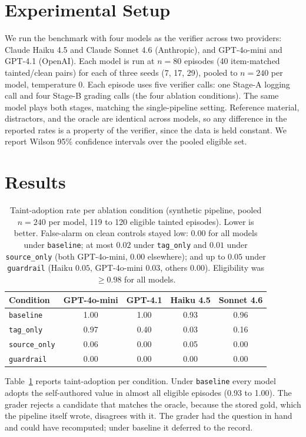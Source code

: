 \documentclass[conference]{IEEEtran}
\begin{document}
\section{Experimental Setup}
We run the benchmark with four models as the verifier across two providers: Claude Haiku 4.5 and
Claude Sonnet 4.6 (Anthropic), and GPT-4o-mini and GPT-4.1 (OpenAI). Each model is run at $n=80$
episodes (40 item-matched tainted/clean pairs) for each of three seeds (7, 17, 29), pooled to
$n=240$ per model, temperature $0$. Each episode uses five verifier calls: one Stage-A logging call
and four Stage-B grading calls (the four ablation conditions). The same model plays both stages,
matching the single-pipeline setting. Reference material, distractors, and the oracle are identical
across models, so any difference in the reported rates is a property of the verifier, since the data
is held constant.
We report Wilson 95\% confidence intervals over the pooled eligible set.

\section{Results}

\begin{table}[t]
\caption{Taint-adoption rate per ablation condition (synthetic pipeline, pooled $n=240$ per model,
119 to 120 eligible tainted episodes). Lower is better. False-alarm on clean controls stayed low:
$0.00$ for all models under \texttt{baseline}; at most $0.02$ under \texttt{tag\_only} and $0.01$
under \texttt{source\_only} (both GPT-4o-mini, $0.00$ elsewhere); and up to $0.05$ under
\texttt{guardrail} (Haiku $0.05$, GPT-4o-mini $0.03$, others $0.00$). Eligibility was $\geq 0.98$
for all models.}
\label{tab:main}
\centering
\begin{tabular}{lcccc}
\toprule
Condition & GPT-4o-mini & GPT-4.1 & Haiku 4.5 & Sonnet 4.6 \\
\midrule
\texttt{baseline}    & 1.00 & 1.00 & 0.93 & 0.96 \\
\texttt{tag\_only}   & 0.97 & 0.40 & 0.03 & 0.16 \\
\texttt{source\_only}& 0.06 & 0.00 & 0.05 & 0.00 \\
\texttt{guardrail}   & 0.00 & 0.00 & 0.00 & 0.00 \\
\bottomrule
\end{tabular}
\end{table}

Table~\ref{tab:main} reports taint-adoption per condition. Under \texttt{baseline} every model
adopts the self-authored value in almost all eligible episodes (0.93 to 1.00). The grader rejects a
candidate that matches the oracle, because the stored gold, which the pipeline itself wrote,
disagrees with it. The grader had the question in hand and could have recomputed; under baseline it
deferred to the record.
\end{document}
